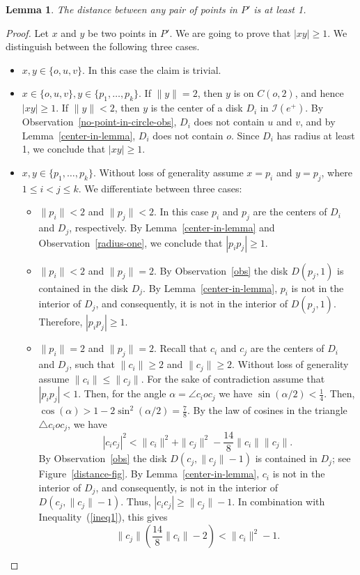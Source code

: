 \documentclass[11pt,a4paper]{article}
\newtheorem{lemma}{Lemma}
\begin{document}
\begin{lemma}
\label{distance-lemma}
The distance between any pair of points in $P'$ is at least 1.
\end{lemma}
\begin{proof}
Let $x$ and $y$ be two points in $P'$. We are going to prove that $|xy|\ge 1$. We distinguish between the following three cases. 
\begin{itemize}
 \item $x,y \in\{o,u,v\}$. In this case the claim is trivial.
\item $x\in \{o,u,v\}, y\in \{p_1,\dots, p_k\}$. If $\|y\|=2$, then $y$ is on $C(o,2)$, and hence $|xy|\ge 1$. If $\|y\|<2$, then $y$ is the center of a disk $D_i$ in $\mathcal{I}(e^+)$. By Observation~\ref{no-point-in-circle-obs}, $D_i$ does not contain $u$ and $v$, and by Lemma~\ref{center-in-lemma}, $D_i$ does not contain $o$. Since $D_i$ has radius at least 1, we conclude that $|xy|\ge 1$.

\item $x,y\in\{p_1,\dots,p_k\}$. Without loss of generality assume $x=p_i$ and $y= p_j$, where $1\le i<j\le k$. We differentiate between three cases:
\begin{itemize}
 \item $\|p_i\|< 2$ and $\|p_j\|<2$. In this case $p_i$ and $p_j$ are the centers of $D_i$ and $D_j$, respectively. By Lemma~\ref{center-in-lemma} and Observation~\ref{radius-one}, we conclude that $|p_ip_j|\ge 1$.

\item $\|p_i\|< 2$ and $\|p_j\|=2$. By Observation~\ref{obs} the disk $D(p_j, 1)$ is contained in the disk $D_j$. By Lemma~\ref{center-in-lemma}, $p_i$ is not in the interior of $D_j$, and consequently, it is not in the interior of $D(p_j,1)$. Therefore, $|p_ip_j|\ge 1$.
\item $\|p_i\|= 2$ and $\|p_j\|=2$. Recall that $c_i$ and $c_j$ are the centers of $D_i$ and $D_j$, such that $\|c_i\|\ge 2$ and $\|c_j\|\ge2$. Without loss of generality assume $\|c_i\|\le \|c_j\|$. For the sake of contradiction assume that $|p_ip_j|<1$. Then, for the angle $\alpha=\angle c_i o c_j$ we have $\sin(\alpha/2)< \frac{1}{4}$. Then, $\cos(\alpha)> 1-2\sin^2(\alpha/2)=\frac{7}{8}$. By the law of cosines in the triangle $\bigtriangleup c_ioc_j$, we have
\begin{equation}
\label{ineq1}
|c_ic_j|^2<\|c_i\|^2+\|c_j\|^2-\frac{14}{8}\|c_i\|\|c_j\|.
\end{equation}
By Observation~\ref{obs} the disk $D(c_j,\|c_j\|-1)$ is contained in $D_j$; see Figure~\ref{distance-fig}. By Lemma~\ref{center-in-lemma}, $c_i$ is not in the interior of $D_j$, and consequently, is not in the interior of $D(c_j,\|c_j\|-1)$. Thus, $|c_ic_j|\ge \|c_j\|-1$. In combination with Inequality~(\ref{ineq1}), this gives
\begin{equation}
 \label{ineq2}
\|c_j\|\left(\frac{14}{8}\|c_i\|-2\right) < \|c_i\|^2-1.
\end{equation}


\end{itemize}
\end{itemize}
\end{proof}
\end{document}
